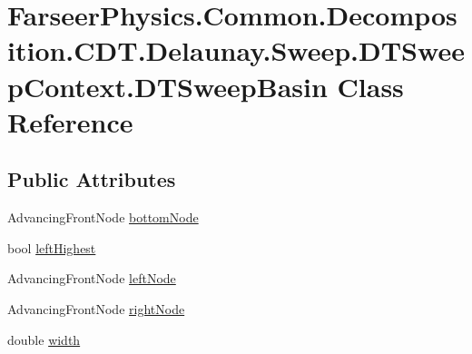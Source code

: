 \hypertarget{class_farseer_physics_1_1_common_1_1_decomposition_1_1_c_d_t_1_1_delaunay_1_1_sweep_1_1_d_t_sweep_context_1_1_d_t_sweep_basin}{\section{Farseer\+Physics.\+Common.\+Decomposition.\+C\+D\+T.\+Delaunay.\+Sweep.\+D\+T\+Sweep\+Context.\+D\+T\+Sweep\+Basin Class Reference}
\label{class_farseer_physics_1_1_common_1_1_decomposition_1_1_c_d_t_1_1_delaunay_1_1_sweep_1_1_d_t_sweep_context_1_1_d_t_sweep_basin}
}
\subsection*{Public Attributes}
\begin{DoxyCompactItemize}
\item 
Advancing\+Front\+Node \hyperlink{class_farseer_physics_1_1_common_1_1_decomposition_1_1_c_d_t_1_1_delaunay_1_1_sweep_1_1_d_t_sweep_context_1_1_d_t_sweep_basin_adc5e84f927f3beee43bf5c2cd24a07e7}{bottom\+Node}
\item 
bool \hyperlink{class_farseer_physics_1_1_common_1_1_decomposition_1_1_c_d_t_1_1_delaunay_1_1_sweep_1_1_d_t_sweep_context_1_1_d_t_sweep_basin_a05eb05277ea4e03248723efb54877181}{left\+Highest}
\item 
Advancing\+Front\+Node \hyperlink{class_farseer_physics_1_1_common_1_1_decomposition_1_1_c_d_t_1_1_delaunay_1_1_sweep_1_1_d_t_sweep_context_1_1_d_t_sweep_basin_a3388c15792538f35c9c029e914941196}{left\+Node}
\item 
Advancing\+Front\+Node \hyperlink{class_farseer_physics_1_1_common_1_1_decomposition_1_1_c_d_t_1_1_delaunay_1_1_sweep_1_1_d_t_sweep_context_1_1_d_t_sweep_basin_a4f16832c8e314e8b48ff9c949fe67bc1}{right\+Node}
\item 
double \hyperlink{class_farseer_physics_1_1_common_1_1_decomposition_1_1_c_d_t_1_1_delaunay_1_1_sweep_1_1_d_t_sweep_context_1_1_d_t_sweep_basin_a7d45ba0a41d4abcad2ae1b79b403148e}{width}
\end{DoxyCompactItemize}


